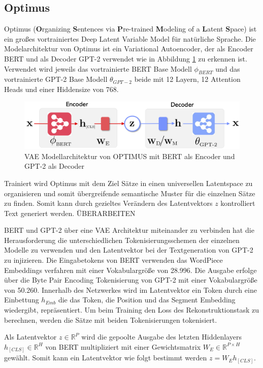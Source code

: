 \subsection{Optimus}
Optimus (\textbf{O}rganizing \textbf{S}entences via \textbf{P}re-trained \textbf{M}odeling of a \textbf{L}atent \textbf{S}pace) \citep{DBLP:journals/corr/abs-2004-04092} ist ein großes vortrainiertes Deep Latent Variable Model für natürliche Sprache.
Die Modelarchitektur von Optimus ist ein Variational Autoencoder, der als Encoder BERT und als Decoder GPT-2 verwendet wie in Abbildung \ref{optimus_scheme_fig} zu erkennen ist. 
Verwendet wird jeweils das vortrainierte BERT Base Modell $\phi_{BERT}$ und das vortrainierte GPT-2 Base Modell $\theta_{GPT-2}$ beide mit 12 Layern, 12 Attention Heads und einer Hiddensize von 768. 
\begin{figure}[h]
    \centering
    \includegraphics[width=\textwidth]{bilder/optimus_scheme}
    \caption{VAE Modellarchitektur von OPTIMUS mit BERT als Encoder und GPT-2 als Decoder}
    \label{optimus_scheme_fig}
\end{figure}
Trainiert wird Optimus mit dem Ziel Sätze in einen universellen Latentspace zu organisieren und somit übergreifende semantische Muster für die einzelnen Sätze zu finden.
Somit kann durch gezieltes Verändern des Latentvektors $z$ kontrolliert Text generiert werden. ÜBERARBEITEN

BERT und GPT-2 über eine VAE Architektur miteinander zu verbinden hat die Herausforderung die unterschiedlichen Tokenisierungsschemen der einzelnen Modelle zu verwenden und den Latentvektor bei der Textgeneration von GPT-2 zu injizieren. 
Die Eingabetokens von BERT verwenden das WordPiece Embeddings verfahren mit einer Vokabulargröße von 28.996. Die Ausgabe erfolge über die Byte Pair Encoding Tokenisierung von GPT-2 mit einer Vokabulargröße von 50.260. Innerhalb des Netzwerkes wird im Latentvektor ein Token durch eine Einbettung $h_{Emb}$ die das Token, die Position und das Segment Embedding wiedergibt, repräsentiert.
Um beim Training den Loss des Rekonstruktionstask zu berechnen, werden die Sätze mit beiden Tokenisierungen tokenisiert.

Als Latentvektor $z \in \mathbb{R}^P$ wird die gepoolte Ausgabe des letzten Hiddenlayers $h_{[CLS]} \in \mathbb{R}^H$ von BERT multipliziert mit einer Gewichtsmatrix $W_{E} \in \mathbb{R}^{P\times H}$ gewählt. Somit kann ein Latentvektor wie folgt bestimmt werden $z = W_{E}h_{[CLS]}$.

